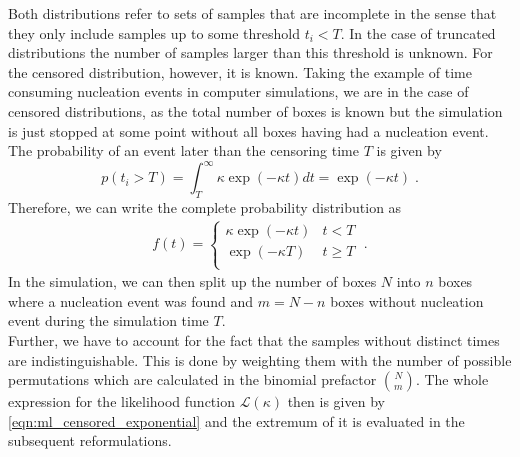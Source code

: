 Both distributions refer to sets of samples that are incomplete in the sense that they only include samples up to some threshold $t_i < T$. In the case of truncated distributions the number of samples larger than this threshold is unknown. For the censored distribution, however, it is known. Taking the example of time consuming nucleation events in computer simulations, we are in the case of censored distributions, as the total number of boxes is known but the simulation is just stopped at some point without all boxes having had a nucleation event. The probability of an event later than the censoring time $T$ is given by
\begin{equation}
\label{eqn:prob_t_larger_T}
p(t_i>T) = \int_T^{\infty} \kappa \exp(-\kappa t) dt = \exp(-\kappa t) \; \text{.}
\end{equation}
Therefore, we can write the complete probability distribution as
\begin{align}
\label{eqn:pdf_censored}
f(t) = 
\begin{cases}
\kappa \exp(-\kappa t) & t < T\\
\exp(-\kappa T) & t \geq T\\ 
\end{cases} \; \text{.}
\end{align}
In the simulation, we can then split up the number of boxes $N$ into $n$ boxes where a nucleation event was found and $m = N -n$ boxes without nucleation event during the simulation time $T$.\\
Further, we have to account for the fact that the samples without distinct times are indistinguishable. This is done by weighting them with the number of possible permutations which are calculated in the binomial prefactor $\binom{N}{m}$. The whole expression for the likelihood function $\mathcal{L}(\kappa)$ then is given by \autoref{eqn:ml_censored_exponential} and the extremum of it is evaluated in the subsequent reformulations.
